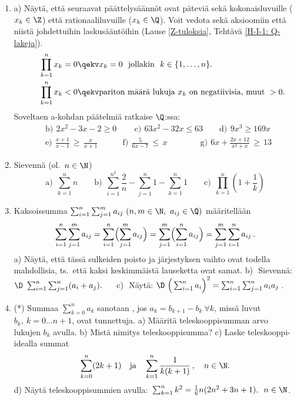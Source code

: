 \begin{enumerate}
\item
a) Näytä, että seuraavat päättelysäännöt ovat päteviä sekä kokonaisluvuille ($x_k\in\Z$) että
rationaaliluvuille ($x_k\in\Q$). Voit vedota sekä aksioomiin että niistä johdettuihin
laskusääntöihin
(Lause \ref{Z-tuloksia}, Tehtävä \ref{H-I-1: Q-lakeja}).
\begin{align*}
&\quad\ \ \prod_{k=1}^n x_k = 0 \qekv x_k=0\ \ \text{jollakin}\ \ k\in\{1,\ldots,n\}. \\
&\quad\ \ \prod_{k=1}^n x_k < 0 \qekv 
                               \text{pariton määrä lukuja $x_k$ on negatiivisia, muut}\ >0.
\end{align*}
Soveltaen a-kohdan päätelmiä ratkaise $\Q$:ssa:
\vspace{1mm}
\begin{align*}
&\text{b)}\,\ 2x^2-3x-2 \ge 0 \qquad\,
 \text{c)}\,\ 63x^2-32x \le 63 \qquad
 \text{d)}\,\ 9x^3 \ge 169x \\[1mm]
&\text{e)}\,\ \frac{x+1}{x-1}\,\ge\,\frac{x}{x+1} \qquad\quad
 \text{f)}\,\ \frac{5}{6x-7}\,\le\,x \qquad\qquad
 \text{g)}\,\ 6x+\frac{2x+12}{x^2+x}\,\ge\,13
\end{align*}

\item
Sievennä (ol.\ $n\in\N$)
\[
\text{a)}\ \ \sum_{k=1}^n n \qquad
\text{b)}\ \ \sum_{i=1}^{n^2} \frac{2}{n} - \sum_{j=1}^n 1 - \sum_{k=1}^n 1 \qquad
\text{c)}\ \ \prod_{k=1}^n \left(1+\frac{1}{k}\right)
\]

\item 
Kaksoissumma $\sum_{i=1}^n\sum_{j=1}^m a_{ij}\ (n,m\in\N,\ a_{ij}\in\Q)$ määritellään
\[
\sum_{i=1}^n\sum_{j=1}^m a_{ij} = \sum_{i=1}^n\Bigl(\sum_{j=1}^m a_{ij}\Bigr) 
                                = \sum_{j=1}^m\Bigl(\sum_{i=1}^n a_{ij}\Bigr)
                                = \sum_{j=1}^m\sum_{i=1}^n a_{ij}\,.
\]
a) Näytä, että tässä sulkeiden poisto ja järjestyksen vaihto ovat todella mahdollisia, ts.\ 
että kaksi keskimmäistä lauseketta ovat samat. \vspace{1mm}\newline
b)\,\ Sievennä: $\D \ \sum_{i=1}^n\sum_{j=1}^n (a_i + a_j). \quad\ $
c)\,\ Näytä: $\D \ \Bigl(\,\sum_{i=1}^n a_i \Bigr)^2 = \sum_{i=1}^n\sum_{j=1}^n a_i a_j\,$.

\item (*)  \label{H-I-1: teleskooppisumma} 
Summaa $\sum_{k=0}^n a_k$ sanotaan \kor{teleskooppisummaksi}, jos $a_k=b_{k+1}-b_k\ \forall k$, 
missä luvut $b_k,\ k=0 \ldots n+1$,
ovat tunnettuja. \newline
a) Määritä teleskooppisumman arvo lukujen $b_k$ avulla.\newline
b) Mistä nimitys teleskooppisumma?\newline
c) Laske teleskooppi-idealla summat
\[
\sum_{k=0}^n (2k+1) \quad \text{ja} \quad \sum_{k=1}^n\frac{1}{k(k+1)}\,, \quad n\in\N.
\]
d) Näytä teleskooppisummien avulla:\, $\sum_{k=1}^n k^2 = \tfrac{1}{6}n(2n^2+3n+1),\,\ n\in\N$. 

\end{enumerate}